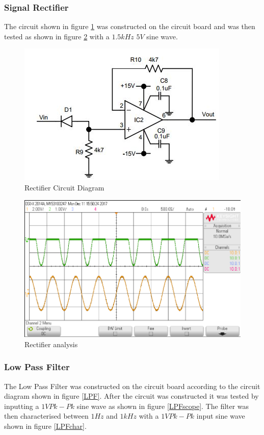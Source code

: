 \documentclass[10pt,a4paper]{article}
\begin{document}
\subsubsection{Signal Rectifier}
The circuit shown in figure \ref{RecDia} was constructed on the circuit board and was then tested as shown in figure \ref{Rectifier} with a $1.5kHz$ $5V$ sine wave.





\begin{figure}[!h]
\includegraphics[scale= 0.75]{rectifierdia}
\caption{Rectifier Circuit Diagram}
\label{RecDia}
\end{figure}

\begin{figure}[!h]
\includegraphics[scale= 0.5]{rectifier}
\caption{Rectifier analysis}
\label{Rectifier}
\end{figure}
\subsubsection{Low Pass Filter}
The Low Pass Filter was constructed on the circuit board according to the circuit diagram shown in figure \ref{LPF}. After the circuit was constructed it was tested by inputting a $1V Pk-Pk$ sine wave as shown in figure \ref{LPFscope}. The filter was then characterised between $1Hz$ and $1kHz$ with a $1V Pk-Pk$ input sine wave shown in figure \ref{LPFchar}. 
\end{document}
